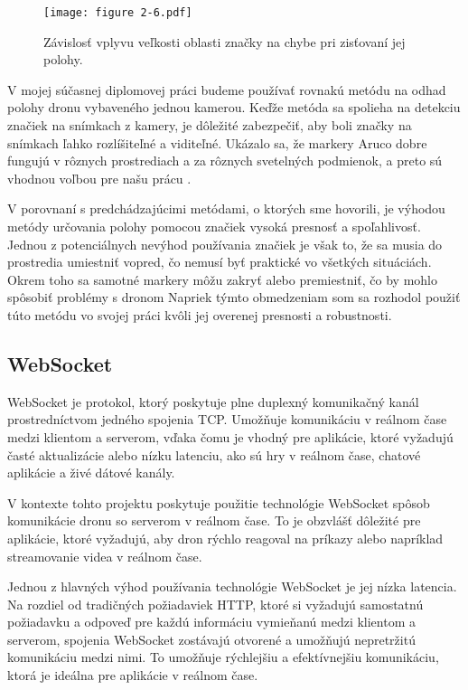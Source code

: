 \begin{figure}[ht!]
    \centering
    \texttt{[image: figure 2-6.pdf]}
    \caption{Závislosť vplyvu veľkosti oblasti značky na chybe pri zisťovaní jej polohy.}
    \label{o:2-6}
\end{figure}

V mojej súčasnej diplomovej práci budeme používať rovnakú metódu na odhad polohy dronu vybaveného jednou kamerou. Keďže metóda sa spolieha na detekciu značiek na snímkach z kamery, je dôležité zabezpečiť, aby boli značky na snímkach ľahko rozlíšiteľné a viditeľné. Ukázalo sa, že markery Aruco dobre fungujú v rôznych prostrediach a za rôznych svetelných podmienok, a preto sú vhodnou voľbou pre našu prácu \citep{Cheng2017}.

\newpage
V porovnaní s predchádzajúcimi metódami, o ktorých sme hovorili, je výhodou metódy určovania polohy pomocou značiek vysoká presnosť a spoľahlivosť. Jednou z potenciálnych nevýhod používania značiek je však to, že sa musia do prostredia umiestniť vopred, čo nemusí byť praktické vo všetkých situáciách. Okrem toho sa samotné markery môžu zakryť alebo premiestniť, čo by mohlo spôsobiť problémy s dronom Napriek týmto obmedzeniam som sa rozhodol použiť túto metódu vo svojej práci kvôli jej overenej presnosti a robustnosti.

\subsection{WebSocket}
WebSocket je protokol, ktorý poskytuje plne duplexný komunikačný kanál prostredníctvom jedného spojenia TCP. Umožňuje komunikáciu v reálnom čase medzi klientom a serverom, vďaka čomu je vhodný pre aplikácie, ktoré vyžadujú časté aktualizácie alebo nízku latenciu, ako sú hry v reálnom čase, chatové aplikácie a živé dátové kanály.

V kontexte tohto projektu poskytuje použitie technológie WebSocket spôsob komunikácie dronu so serverom v reálnom čase. To je obzvlášť dôležité pre aplikácie, ktoré vyžadujú, aby dron rýchlo reagoval na príkazy alebo napríklad streamovanie videa v reálnom čase.

Jednou z hlavných výhod používania technológie WebSocket je jej nízka latencia. Na rozdiel od tradičných požiadaviek HTTP, ktoré si vyžadujú samostatnú požiadavku a odpoveď pre každú informáciu vymieňanú medzi klientom a serverom, spojenia WebSocket zostávajú otvorené a umožňujú nepretržitú komunikáciu medzi nimi. To umožňuje rýchlejšiu a efektívnejšiu komunikáciu, ktorá je ideálna pre aplikácie v reálnom čase.

